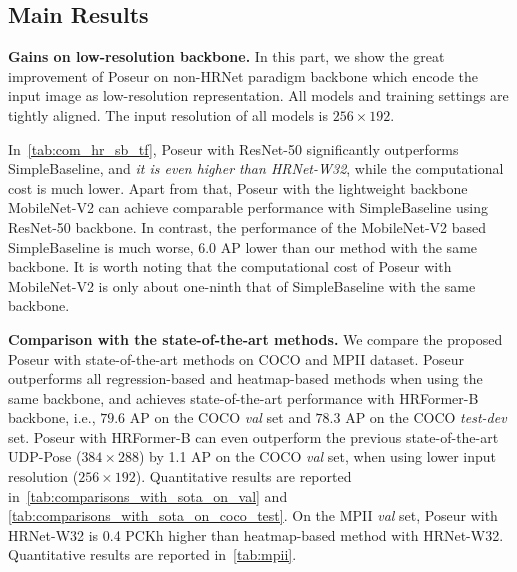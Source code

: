\documentclass[runningheads]{llncs}
\def\ie{{i.e.\xspace}}
\def\handle{{Poseur}\xspace}
\begin{document}
\subsection{Main Results}\label{sec:main_result}




\noindent\textbf{Gains on low-resolution backbone.}
In this part, we show the great improvement of \handle on non-HRNet paradigm backbone which encode the input image as low-resolution representation. All models and training settings are tightly aligned. The input resolution of all models is $256\times192$.

In~\cref{tab:com_hr_sb_tf}, \handle with ResNet-50 significantly outperforms SimpleBaseline, and \textit{it is even higher than HRNet-W32}, while the computational cost is much lower. Apart from that, \handle with the lightweight backbone MobileNet-V2 can achieve comparable performance with SimpleBaseline using ResNet-50 backbone. In contrast, the performance of the MobileNet-V2 based SimpleBaseline is much worse, $6.0$ AP lower than our method with the same backbone. It is worth noting that the computational cost of \handle with MobileNet-V2 is only about one-ninth that of SimpleBaseline with the same backbone.

\noindent\textbf{Comparison with the state-of-the-art methods.}
We compare the proposed \handle with state-of-the-art methods on COCO and MPII dataset.
\handle outperforms all regression-based and heatmap-based methods when using the same backbone, and achieves state-of-the-art performance with HRFormer-B backbone, \ie, $79.6$ AP on the COCO \emph{val} set and $78.3$ AP on the COCO \emph{test-dev} set.  
\handle with HRFormer-B can even outperform the previous state-of-the-art UDP-Pose ($384\times288$) by 1.1 AP on the COCO \emph{val} set, when using lower input resolution ($256\times192$). Quantitative results are reported in~\cref{tab:comparisons_with_sota_on_val} and \cref{tab:comparisons_with_sota_on_coco_test}.
On the MPII \emph{val} set, \handle with HRNet-W32 is 0.4 PCKh higher than heatmap-based method with HRNet-W32. Quantitative results are reported in~\cref{tab:mpii}.
\end{document}
